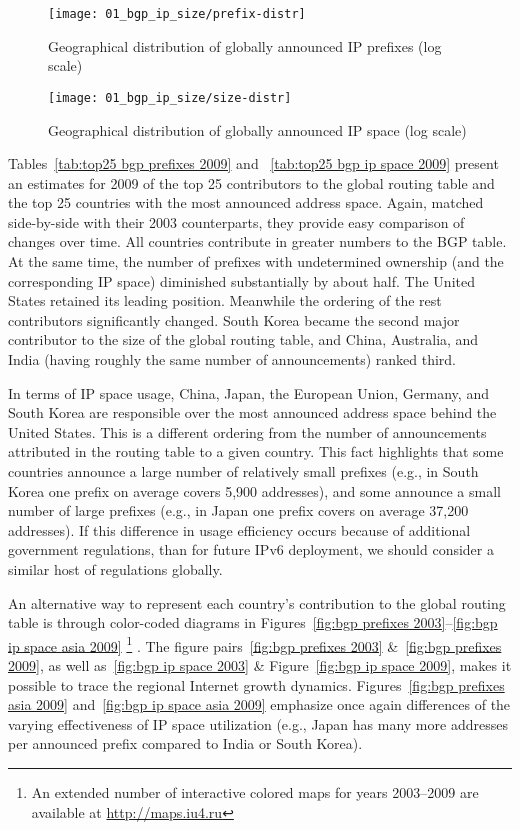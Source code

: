 \begin{figure}[htbp]
	\centering
		\texttt{[image: 01\_bgp\_ip\_size/prefix-distr]}
	\caption{Geographical distribution of globally announced IP prefixes (log scale)}
	\label{fig:prefix distr}
\end{figure}

\begin{figure}[htbp]
	\centering
		\texttt{[image: 01\_bgp\_ip\_size/size-distr]}
	\caption{Geographical distribution of globally announced IP space (log scale)}
	\label{fig:size distr}
\end{figure}

Tables~\ref{tab:top25 bgp prefixes 2009} and ~\ref{tab:top25 bgp ip space 2009}
present an estimates for 2009 of the top 25 contributors to the global routing
table and the top 25 countries with the most announced address space. Again,
matched side-by-side with their 2003 counterparts, they provide easy comparison
of changes over time.  All countries contribute in greater numbers to the BGP
table. At the same time, the number of prefixes with undetermined ownership
(and the corresponding IP space) diminished substantially by about half. The
United States retained its leading position. Meanwhile the ordering of the rest
contributors significantly changed. South Korea became the second major
contributor to the size of the global routing table, and China, Australia, and
India (having roughly the same number of announcements) ranked third.

In terms of IP space usage, China, Japan, the European Union, Germany, and
South Korea are responsible over the most announced address space behind the
United States. This is a different ordering from the number of announcements
attributed in the routing table to a given country.  This fact highlights that
some countries announce a large number of relatively small prefixes (e.g., in
South Korea one prefix on average covers 5,900 addresses), and some announce a
small number of large prefixes (e.g., in Japan one prefix covers on average
37,200 addresses). If this difference in usage efficiency occurs because of
additional government regulations, than for future IPv6 deployment, we should
consider a similar host of regulations globally.


An alternative way to represent each country's contribution to the global
routing table is through color-coded diagrams in Figures~\ref{fig:bgp prefixes
2003}--\ref{fig:bgp ip space asia 2009}%
%
\footnote{%
An extended number of interactive colored maps for years 2003--2009 are
available at \url{http://maps.iu4.ru}}%
%
. The figure pairs~\ref{fig:bgp prefixes
2003} \&~\ref{fig:bgp prefixes 2009}, as well as~\ref{fig:bgp ip space 2003} \&
Figure~\ref{fig:bgp ip space 2009}, makes it possible to trace the regional
Internet growth dynamics. Figures~\ref{fig:bgp prefixes asia 2009}
and~\ref{fig:bgp ip space asia 2009} emphasize once again differences of the
varying effectiveness of IP space utilization (e.g., Japan has many more
addresses per announced prefix compared to India or South Korea).




